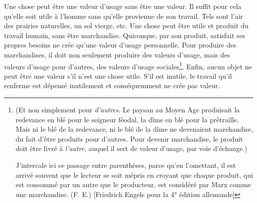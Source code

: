 \documentclass[french,twoside]{book} %
\begin{document}
Une chose peut être une valeur d’usage sans être une valeur. Il suffit pour cela qu’elle soit utile à l’homme sans qu’elle provienne de son travail. Tels sont l’air des prairies naturelles, un sol vierge, etc. Une chose peut être utile et produit du travail humain, sans être marchandise. Quiconque, par son produit, satisfait ses propres besoins ne crée qu’une valeur d’usage personnelle. Pour produire des marchandises, il doit non seulement produire des valeurs d’usage, mais des valeurs d’usage pour d’autres, des valeurs d’usage sociales\footnote{ \noindent (Et non simplement pour \emph{d’autres}. Le paysan au Moyen Age produisait la redevance en blé pour le seigneur féodal, la dîme en blé pour la prêtraille. Mais ni le blé de la redevance, ni le blé de la dîme ne devenaient marchandise, du fait d’être produits pour d’autres. Pour devenir marchandise, le produit doit être livré à \emph{l’autre}, auquel il sert de valeur d’usage, par voie d’échange.)\par
 J’intercale ici ce passage entre parenthèses, parce qu’en l’omettant, il est arrivé souvent que le lecteur se soit mépris en croyant que chaque produit, qui est consommé par un autre que le producteur, est considéré par Marx comme une marchandise. (F. E.) [Friedrich Engels pour la 4° édition allemande]
}. Enfin, aucun objet ne peut être une valeur s’il n’est une chose utile. S’il est inutile, le travail qu’il renferme est dépensé inutilement et conséquemment ne crée pas valeur.
\end{document}

